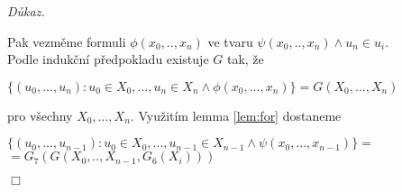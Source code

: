 \documentclass[12pt,a4paper]{article}
\newenvironment{proof}
{\noindent \textit{D\r{u}kaz.}}
{\hspace*{\fill} $\Box$}
\begin{document}
\begin{proof}
\begin{description}
Pak vezm\v{e}me formuli $  \phi(x_0,.., x_{n})  $ ve tvaru $ \psi(x_0,..,x_{n}) \wedge u_{n} \in u_i $. \\
Podle induk\v{c}n\'{i} p\v{r}edpokladu existuje $ G $ tak, \v{z}e 
\begin{center}
  $\{(u_{0} ,..., u_{n}) : u_{0} \in  X_{0} ,..., u_{n} \in  X_{n} \wedge \phi(x_0,...,x_{n})  \}=G(X_{0},...,X_{n})$
 \end{center} 
 pro v\v{s}echny $ X_{0},...,X_{n} $. Vyu\v{z}it\'{i}m lemma \ref{lem:for} dostaneme
\begin{center}
$ \{(u_{0} ,..., u_{n-1}) : u_{0} \in  X_{0} , ... , u_{n-1} \in  X_{n-1} \wedge \psi(x_0,...,x_{n-1})  \}=$ $=G_7(G(X_{0},..,X_{n-1}, G_6(X_i)))  $
\end{center}
\end{description}  
\end{proof}
\end{document}
